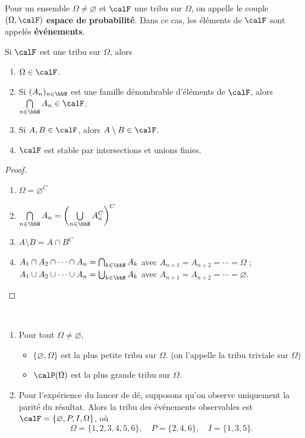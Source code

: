 \begin{deff}
    Pour un ensemble $\Omega \neq \varnothing$ et $\calF$ une tribu sur $\Omega$,
    on appelle le couple $(\Omega, \calF)$ \textbf{espace de probabilité}.
    Dans ce cas, les éléments de $\calF$ sont appelés \textbf{événements}.
\end{deff}

\begin{prop}
    Si $\calF$ est une tribu sur $\Omega$, alors
    \begin{enumerate}
        \item $\Omega \in \calF$.
        \item Si $(A_n)_{n \in \bbN}$ est une famille dénombrable d'éléments de $\calF$,
              alors $\bigcap\limits_{n \in \bbN} A_n \in \calF$.
        \item Si $A, B \in \calF$, alors $A \setminus B \in \calF$.
        \item $\calF$ est stable par intersections et unions finies.
    \end{enumerate}
\end{prop}

\begin{proof}
    $\ $
    \begin{enumerate}
        \item $\Omega = \varnothing^C$
        \item $\bigcap\limits_{n \in \bbN} A_n = \left(\bigcup\limits_{n \in \bbN} A_n^C\right)^C$
        \item $A \setminus B = A \cap B^C$
        \item $A_1 \cap A_2 \cap \cdots \cap A_n = \bigcap_{k \in \bbN} A_k$
              avec $A_{n + 1} = A_{n + 2} = \cdots = \Omega$ ;
              $A_1 \cup A_2 \cup \cdots \cup A_n = \bigcup_{k \in \bbN} A_k$
              avec $A_{n + 1} = A_{n + 2} = \cdots = \varnothing$.
    \end{enumerate}
\end{proof}

\begin{exem}
    $\ $
    \begin{enumerate}
        \item Pour tout $\Omega \neq \varnothing$,
              \begin{itemize}
                  \item $\{ \varnothing, \Omega \}$ est la plus petite tribu sur $\Omega$.
                        (on l'appelle la tribu triviale sur $\Omega$)
                  \item $\calP(\Omega)$ est la plus grande tribu sur $\Omega$.
              \end{itemize}
        \item Pour l'expérience du lancer de dé, supposons qu'on observe uniquement la parité du résultat.
              Alors la tribu des événements observables est $\calF = \{ \varnothing, P, I, \Omega \}$, où
              \[ \Omega = \{ 1, 2, 3, 4, 5, 6 \}, \quad P = \{ 2, 4, 6 \}, \quad I = \{ 1, 3, 5 \}. \]
    \end{enumerate}
\end{exem}

